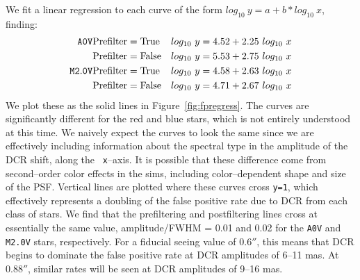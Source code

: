 \documentclass[prd, nofootinbib, floatfix, 11pt, tightenlines, times]{article}
\begin{document}
We fit a linear regression to each curve of the form $log_{10}~y = a +
b * log_{10}~x$, finding:
\begin{eqnarray}
{\tt A0V}   & {\rm Prefilter=True}  & log_{10}~y = 4.52 + 2.25 ~log_{10}~x \\ \nonumber
            & {\rm Prefilter=False} & log_{10}~y = 5.53 + 2.75 ~log_{10}~x \\ \nonumber
{\tt M2.0V} & {\rm Prefilter=True}  & log_{10}~y = 4.58 + 2.63 ~log_{10}~x \\ \nonumber
            & {\rm Prefilter=False} & log_{10}~y = 4.71 + 2.67 ~log_{10}~x 
\end{eqnarray}
We plot these as the solid lines in Figure~\ref{fig:fpregress}.  The
curves are significantly different for the red and blue stars, which
is not entirely understood at this time.  We naively expect the curves
to look the same since we are effectively including information about
the spectral type in the amplitude of the DCR shift, along the {\tt
  x}--axis.  It is possible that these difference come from
second--order color effects in the sims, including color--dependent
shape and size of the PSF.  Vertical lines are plotted where these
curves cross {\tt y=1}, which effectively represents a doubling of the
false positive rate due to DCR from each class of stars.  We find that
the prefiltering and postfiltering lines cross at essentially the same
value, amplitude/FWHM = 0.01 and 0.02 for the {\tt A0V} and {\tt
  M2.0V} stars, respectively.  For a fiducial seeing value of $0.6''$,
this means that DCR begins to dominate the false positive rate at DCR
amplitudes of 6--11 mas.  At $0.88''$, similar rates will be seen at
DCR amplitudes of 9--16 mas.
\end{document}
